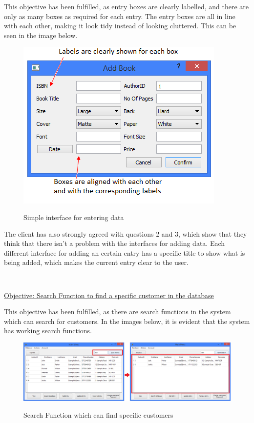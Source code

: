 This objective has been fulfilled, as entry boxes are clearly labelled, and there are only as many boxes as required for each entry. The entry boxes are all in line with each other, making it look tidy instead of looking cluttered. This can be seen in the image below.

\begin{figure}[H]
    \includegraphics[width=\textwidth]{./Evaluation/Evidence/AddingInterface.png}
    \label{fig:AddingInterface} \caption{Simple interface for entering data}
\end{figure}

The client has also strongly agreed with questions 2 and 3, which show that they think that there isn't a problem with the interfaces for adding data. Each different interface for adding an certain entry has a specific title to show what is being added, which makes the current entry clear to the user.

\

\underline{Objective: Search Function to find a specific customer in the database}

This objective has been fulfilled, as there are search functions in the system which can search for customers. In the images below, it is evident that the system has working search functions.

\begin{figure}[H]
    \includegraphics[width=\textwidth]{./Evaluation/Evidence/QuickSearch.png}
    \label{fig:QuickSearchFunction} \caption{Search Function which can find specific customers}
\end{figure}

